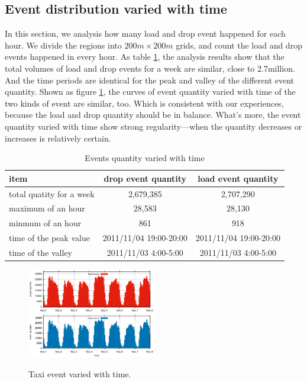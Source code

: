 \subsection{Event distribution varied with time}

In this section, we analysis how many load and drop event happened for each hour.   We divide the regions into $200m\times200m$ grids, and count the load and drop events happened in every hour. As table \ref{table_event_distribution_with_time}, the analysis results show that the total volumes of load and drop events for a week are similar, close to 2.7million. And the time periods are identical for the peak and valley of the different event quantity. 
Shown as figure \ref{figure_event_varied_w_t}, the curves of event quantity varied with time of the two kinds of event are similar, too. Which is consistent  with our experiences, because the load and drop quantity should be in balance.  What’s more, the event quantity varied with time show strong regularity—when the quantity decreases or increases is relatively certain.

\begin{table}[!h]
\caption{Events quantity varied with time}\label{table_event_distribution_with_time}
\centering
\begin{tabular}{l|c|c}
 \hline
 item &drop event quantity &load event quantity \\
  \hline
  total quatity for a week& 2,679,385&2,707,290\\
  maximum of an hour&28,583 &28,130\\
  minmum of an hour&861&918\\
  time of the peak value&2011/11/04 19:00-20:00&2011/11/04 19:00-20:00\\
  time of the valley&2011/11/03 4:00-5:00&2011/11/03 4:00-5:00\\
  \hline
  \end{tabular}
\end{table}

\begin{figure}[!h]
\centering
\includegraphics[width=0.5\textwidth]{figures_201103/analysis/event_w_time.eps}\\
\caption{Taxi event varied with time.}\label{figure_event_varied_w_t}
\end{figure}


